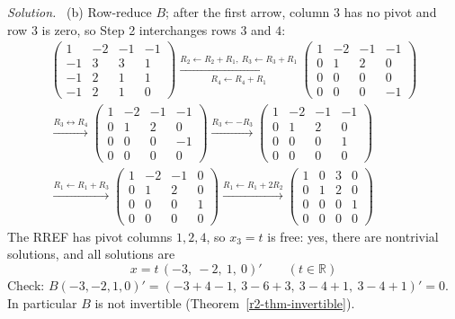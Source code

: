 \documentclass[12pt]{article}
\newcommand{\R}{\mathbb R}
\theoremstyle{definition}
\newenvironment{solution}{\par\noindent\textit{Solution.}\ }{\par\smallskip}
\begin{document}
\begin{solution}
(b) Row-reduce \(B\); after the first arrow, column \(3\) has no pivot and row \(3\) is zero, so Step 2
interchanges rows \(3\) and \(4\):
\[
\begin{gathered}
\begin{pmatrix}1&-2&-1&-1\\-1&3&3&1\\-1&2&1&1\\-1&2&1&0\end{pmatrix}
\xrightarrow[R_4\leftarrow R_4+R_1]{R_2\leftarrow R_2+R_1,\ R_3\leftarrow R_3+R_1}
\begin{pmatrix}1&-2&-1&-1\\0&1&2&0\\0&0&0&0\\0&0&0&-1\end{pmatrix}
\\
\xrightarrow{R_3\leftrightarrow R_4}
\begin{pmatrix}1&-2&-1&-1\\0&1&2&0\\0&0&0&-1\\0&0&0&0\end{pmatrix}
\xrightarrow{R_3\leftarrow-R_3}
\begin{pmatrix}1&-2&-1&-1\\0&1&2&0\\0&0&0&1\\0&0&0&0\end{pmatrix}
\\
\xrightarrow{R_1\leftarrow R_1+R_3}
\begin{pmatrix}1&-2&-1&0\\0&1&2&0\\0&0&0&1\\0&0&0&0\end{pmatrix}
\xrightarrow{R_1\leftarrow R_1+2R_2}
\begin{pmatrix}1&0&3&0\\0&1&2&0\\0&0&0&1\\0&0&0&0\end{pmatrix}
\end{gathered}
\]
The RREF has pivot columns \(1,2,4\), so \(x_3=t\) is free: yes, there are nontrivial solutions, and all
solutions are
\[
x=t\,(-3,\ -2,\ 1,\ 0)'\qquad(t\in\R)
\]
Check: \(B(-3,-2,1,0)'=(-3+4-1,\ 3-6+3,\ 3-4+1,\ 3-4+1)'=0\). In particular \(B\) is not invertible
(Theorem~\ref{r2-thm-invertible}).
\end{solution}
\end{document}
